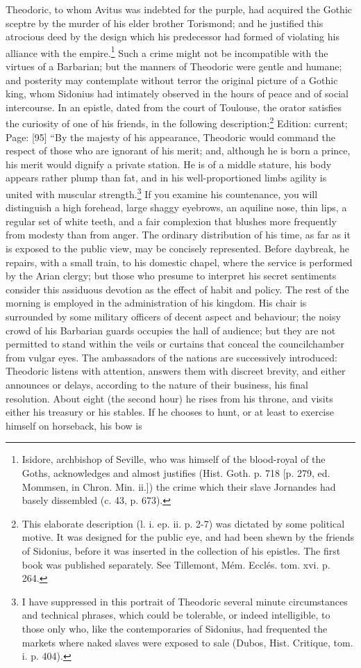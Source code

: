 Theodoric, to whom Avitus was indebted for the purple, had acquired the Gothic sceptre by the murder of his elder brother Torismond; and he justified this atrocious deed by the design which his predecessor had formed of violating his alliance with the empire.\footnote{Isidore, archbishop of Seville, who was himself of the blood-royal of the Goths, acknowledges and almost justifies (Hist. Goth. p. 718 [p. 279, ed. Mommsen, in Chron. Min. ii.]) the crime which their slave Jornandes had basely dissembled (c. 43, p. 673).} Such a crime might not be incompatible with the virtues of a Barbarian; but the manners of Theodoric were gentle and humane; and posterity may contemplate without terror the original picture of a Gothic king, whom Sidonius had intimately observed in the hours of peace and of social intercourse. In an epistle, dated from the court of Toulouse, the orator satisfies the curiosity of one of his friends, in the following description:\footnote{This elaborate description (l. i. ep. ii. p. 2-7) was dictated by some political motive. It was designed for the public eye, and had been shewn by the friends of Sidonius, before it was inserted in the collection of his epistles. The first book was published separately. See Tillemont, Mém. Ecclés. tom. xvi. p. 264.} Edition: current; Page: [95] \texthebrew{“}By the majesty of his appearance, Theodoric would command the respect of those who are ignorant of his merit; and, although he is born a prince, his merit would dignify a private station. He is of a middle stature, his body appears rather plump than fat, and in his well-proportioned limbs agility is united with muscular strength.\footnote{I have suppressed in this portrait of Theodoric several minute circumstances and technical phrases, which could be tolerable, or indeed intelligible, to those only who, like the contemporaries of Sidonius, had frequented the markets where naked slaves were exposed to sale (Dubos, Hist. Critique, tom. i. p. 404).} If you examine his countenance, you will distinguish a high forehead, large shaggy eyebrows, an aquiline nose, thin lips, a regular set of white teeth, and a fair complexion that blushes more frequently from modesty than from anger. The ordinary distribution of his time, as far as it is exposed to the public view, may be concisely represented. Before daybreak, he repairs, with a small train, to his domestic chapel, where the service is performed by the Arian clergy; but those who presume to interpret his secret sentiments consider this assiduous devotion as the effect of habit and policy. The rest of the morning is employed in the administration of his kingdom. His chair is surrounded by some military officers of decent aspect and behaviour; the noisy crowd of his Barbarian guards occupies the hall of audience; but they are not permitted to stand within the veils or curtains that conceal the councilchamber from vulgar eyes. The ambassadors of the nations are successively introduced: Theodoric listens with attention, answers them with discreet brevity, and either announces or delays, according to the nature of their business, his final resolution. About eight (the second hour) he rises from his throne, and visits either his treasury or his stables. If he chooses to hunt, or at least to exercise himself on horseback, his bow is 